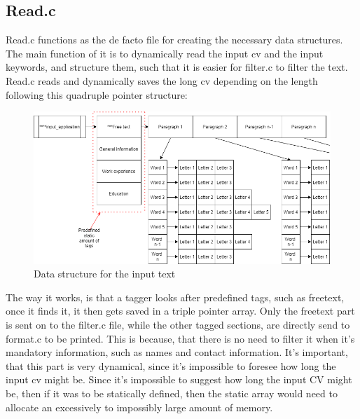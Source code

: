 \subsection{Read.c}
Read.c functions as the de facto file for creating the necessary data structures.
The main function of it is to dynamically read the input cv and the input keywords, and structure them, such that it is easier for filter.c to filter the text.
Read.c reads and dynamically saves the long cv depending on the length following this quadruple pointer structure:

\begin{figure}[H]
  \centering
  \includegraphics[scale = 0.5]{figures/Datastructure_read.png}
  \caption{Data structure for the input text}
\end{figure}
The way it works, is that a tagger looks after predefined tags, such as freetext, once it finds it, it then gets saved in a triple pointer array.
Only the freetext part is sent on to the filter.c file, while the other tagged sections, are directly send to format.c to be printed. This is because, that there is no need
to filter it when it's mandatory information, such as names and contact information.
It's important, that this part is very dynamical, since it's impossible to foresee how long the input cv might be. Since it's impossible to suggest how long the input CV might be, then if it was to be statically defined, then the static array would need to allocate an excessively to impossibly large amount of memory.



